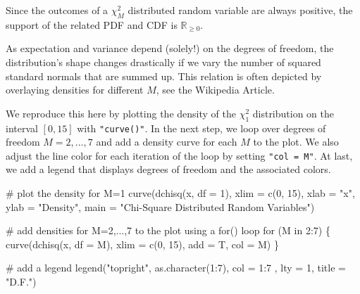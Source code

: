 \documentclass[
  letterpaper,
  DIV=11,
  numbers=noendperiod]{scrreprt}
\newenvironment{Shaded}{\begin{snugshade}}{\end{snugshade}}
\newcommand{\AttributeTok}[1]{\textcolor[rgb]{0.40,0.45,0.13}{#1}}
\newcommand{\CommentTok}[1]{\textcolor[rgb]{0.37,0.37,0.37}{#1}}
\newcommand{\ControlFlowTok}[1]{\textcolor[rgb]{0.00,0.23,0.31}{#1}}
\newcommand{\DecValTok}[1]{\textcolor[rgb]{0.68,0.00,0.00}{#1}}
\newcommand{\FunctionTok}[1]{\textcolor[rgb]{0.28,0.35,0.67}{#1}}
\newcommand{\NormalTok}[1]{\textcolor[rgb]{0.00,0.23,0.31}{#1}}
\newcommand{\SpecialCharTok}[1]{\textcolor[rgb]{0.37,0.37,0.37}{#1}}
\newcommand{\StringTok}[1]{\textcolor[rgb]{0.13,0.47,0.30}{#1}}
\theoremstyle{definition}
\theoremstyle{plain}
\theoremstyle{plain}
\theoremstyle{remark}
\begin{document}
Since the outcomes of a \(\chi^2_M\) distributed random variable are
always positive, the support of the related PDF and CDF is
\(\mathbb{R}_{\geq0}\).

As expectation and variance depend (solely!) on the degrees of freedom,
the distribution's shape changes drastically if we vary the number of
squared standard normals that are summed up. This relation is often
depicted by overlaying densities for different \(M\), see the Wikipedia
Article.

We reproduce this here by plotting the density of the \(\chi_1^2\)
distribution on the interval \([0,15]\) with \texttt{"curve()"}. In the
next step, we loop over degrees of freedom \(M=2,...,7\) and add a
density curve for each \(M\) to the plot. We also adjust the line color
for each iteration of the loop by setting \texttt{"col\ =\ M"}. At last,
we add a legend that displays degrees of freedom and the associated
colors.

\begin{Shaded}
\begin{Highlighting}[]
\CommentTok{\# plot the density for M=1}
\FunctionTok{curve}\NormalTok{(}\FunctionTok{dchisq}\NormalTok{(x, }\AttributeTok{df =} \DecValTok{1}\NormalTok{), }
      \AttributeTok{xlim =} \FunctionTok{c}\NormalTok{(}\DecValTok{0}\NormalTok{, }\DecValTok{15}\NormalTok{), }
      \AttributeTok{xlab =} \StringTok{"x"}\NormalTok{, }
      \AttributeTok{ylab =} \StringTok{"Density"}\NormalTok{, }
      \AttributeTok{main =} \StringTok{"Chi{-}Square Distributed Random Variables"}\NormalTok{)}

\CommentTok{\# add densities for M=2,...,7 to the plot using a \textquotesingle{}for()\textquotesingle{} loop }
\ControlFlowTok{for}\NormalTok{ (M }\ControlFlowTok{in} \DecValTok{2}\SpecialCharTok{:}\DecValTok{7}\NormalTok{) \{}
  \FunctionTok{curve}\NormalTok{(}\FunctionTok{dchisq}\NormalTok{(x, }\AttributeTok{df =}\NormalTok{ M),}
        \AttributeTok{xlim =} \FunctionTok{c}\NormalTok{(}\DecValTok{0}\NormalTok{, }\DecValTok{15}\NormalTok{), }
        \AttributeTok{add =}\NormalTok{ T, }
        \AttributeTok{col =}\NormalTok{ M)}
\NormalTok{\}}

\CommentTok{\# add a legend}
\FunctionTok{legend}\NormalTok{(}\StringTok{"topright"}\NormalTok{, }
       \FunctionTok{as.character}\NormalTok{(}\DecValTok{1}\SpecialCharTok{:}\DecValTok{7}\NormalTok{), }
       \AttributeTok{col =} \DecValTok{1}\SpecialCharTok{:}\DecValTok{7}\NormalTok{ , }
       \AttributeTok{lty =} \DecValTok{1}\NormalTok{, }
       \AttributeTok{title =} \StringTok{"D.F."}\NormalTok{)}
\end{Highlighting}
\end{Shaded}
\end{document}
